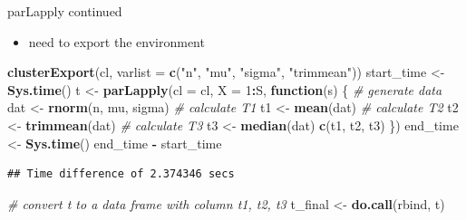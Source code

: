 \documentclass[
  ignorenonframetext,
]{beamer}
\newenvironment{Shaded}{\begin{snugshade}}{\end{snugshade}}
\newcommand{\AttributeTok}[1]{\textcolor[rgb]{0.13,0.29,0.53}{#1}}
\newcommand{\CommentTok}[1]{\textcolor[rgb]{0.56,0.35,0.01}{\textit{#1}}}
\newcommand{\ControlFlowTok}[1]{\textcolor[rgb]{0.13,0.29,0.53}{\textbf{#1}}}
\newcommand{\DecValTok}[1]{\textcolor[rgb]{0.00,0.00,0.81}{#1}}
\newcommand{\FunctionTok}[1]{\textcolor[rgb]{0.13,0.29,0.53}{\textbf{#1}}}
\newcommand{\NormalTok}[1]{#1}
\newcommand{\OtherTok}[1]{\textcolor[rgb]{0.56,0.35,0.01}{#1}}
\newcommand{\SpecialCharTok}[1]{\textcolor[rgb]{0.81,0.36,0.00}{\textbf{#1}}}
\newcommand{\StringTok}[1]{\textcolor[rgb]{0.31,0.60,0.02}{#1}}
\providecommand{\tightlist}{%
  \setlength{\itemsep}{0pt}\setlength{\parskip}{0pt}}
\begin{document}
\begin{frame}[fragile]{parLapply continued}
\protect{}\label{parlapply-continued}
\tiny

\begin{itemize}
\tightlist
\item
  need to export the environment
\end{itemize}

\begin{Shaded}
\begin{Highlighting}[]
\FunctionTok{clusterExport}\NormalTok{(cl, }\AttributeTok{varlist =} \FunctionTok{c}\NormalTok{(}\StringTok{"n"}\NormalTok{, }\StringTok{"mu"}\NormalTok{, }\StringTok{"sigma"}\NormalTok{, }\StringTok{"trimmean"}\NormalTok{))}
\NormalTok{start\_time }\OtherTok{\textless{}{-}} \FunctionTok{Sys.time}\NormalTok{()}
\NormalTok{t }\OtherTok{\textless{}{-}} \FunctionTok{parLapply}\NormalTok{(}\AttributeTok{cl =}\NormalTok{ cl, }\AttributeTok{X =} \DecValTok{1}\SpecialCharTok{:}\NormalTok{S, }\ControlFlowTok{function}\NormalTok{(s) \{}
  \CommentTok{\# generate data}
\NormalTok{  dat }\OtherTok{\textless{}{-}} \FunctionTok{rnorm}\NormalTok{(n, mu, sigma)}
  \CommentTok{\# calculate T1}
\NormalTok{  t1 }\OtherTok{\textless{}{-}} \FunctionTok{mean}\NormalTok{(dat)}
  \CommentTok{\# calculate T2}
\NormalTok{  t2 }\OtherTok{\textless{}{-}} \FunctionTok{trimmean}\NormalTok{(dat)}
  \CommentTok{\# calculate T3}
\NormalTok{  t3 }\OtherTok{\textless{}{-}} \FunctionTok{median}\NormalTok{(dat)}
  \FunctionTok{c}\NormalTok{(t1, t2, t3)}
\NormalTok{\})}
\NormalTok{end\_time }\OtherTok{\textless{}{-}} \FunctionTok{Sys.time}\NormalTok{()}
\NormalTok{end\_time }\SpecialCharTok{{-}}\NormalTok{ start\_time}
\end{Highlighting}
\end{Shaded}

\begin{verbatim}
## Time difference of 2.374346 secs
\end{verbatim}

\begin{Shaded}
\begin{Highlighting}[]
\CommentTok{\# convert t to a data frame with column t1, t2, t3}
\NormalTok{t\_final }\OtherTok{\textless{}{-}} \FunctionTok{do.call}\NormalTok{(rbind, t)}
\end{Highlighting}
\end{Shaded}
\end{frame}
\end{document}
